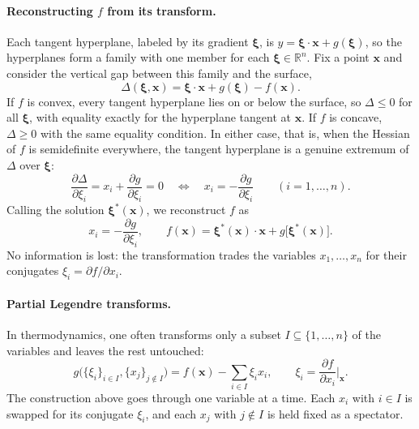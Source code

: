 \paragraph{Reconstructing $f$ from its transform.}
Each tangent hyperplane, labeled by its gradient $\boldsymbol{\xi}$, is
$y=\boldsymbol{\xi}\cdot\mathbf{x}+g(\boldsymbol{\xi})$, so the hyperplanes
form a family with one member for each $\boldsymbol{\xi}\in\mathbb{R}^n$.
Fix a point $\mathbf{x}$ and consider the vertical gap between this family
and the surface,
\begin{equation*}
    \Delta(\boldsymbol{\xi},\mathbf{x})
    =\boldsymbol{\xi}\cdot\mathbf{x}+g(\boldsymbol{\xi})-f(\mathbf{x}).
\end{equation*}
If $f$ is convex, every tangent hyperplane lies on or below the surface, so
$\Delta\leq0$ for all $\boldsymbol{\xi}$, with equality exactly for the
hyperplane tangent at $\mathbf{x}$. If $f$ is concave, $\Delta\geq0$ with the
same equality condition. In either case, that is, when the Hessian of $f$ is
semidefinite everywhere, the tangent hyperplane is a genuine extremum of
$\Delta$ over $\boldsymbol{\xi}$:
\begin{equation*}
    \frac{\partial\Delta}{\partial\xi_i}
    =x_i+\frac{\partial g}{\partial\xi_i}=0
    \quad\Longleftrightarrow\quad
    x_i=-\frac{\partial g}{\partial\xi_i}
    \qquad(i=1,\ldots,n).
\end{equation*}
Calling the solution $\boldsymbol{\xi}^*(\mathbf{x})$, we reconstruct $f$ as
\begin{equation}
    \boxed{x_i=-\frac{\partial g}{\partial\xi_i},\qquad
    f(\mathbf{x})=\boldsymbol{\xi}^*(\mathbf{x})\cdot\mathbf{x}
    +g\big[\boldsymbol{\xi}^*(\mathbf{x})\big].}
\end{equation}
No information is lost: the transformation trades the variables
$x_1,\ldots,x_n$ for their conjugates $\xi_i=\partial f/\partial x_i$.

\paragraph{Partial Legendre transforms.}
In thermodynamics, one often transforms only a subset
$I\subseteq\{1,\ldots,n\}$ of the variables and leaves the rest untouched:
\begin{equation}
    \boxed{g\big(\{\xi_i\}_{i\in I},\{x_j\}_{j\notin I}\big)
    =f(\mathbf{x})-\sum_{i\in I}\xi_i x_i,
    \qquad \xi_i=\frac{\partial f}{\partial x_i}\bigg|_{\mathbf{x}}.}
\end{equation}
The construction above goes through one variable at a time. Each $x_i$ with
$i\in I$ is swapped for its conjugate $\xi_i$, and each $x_j$ with
$j\notin I$ is held fixed as a spectator.


